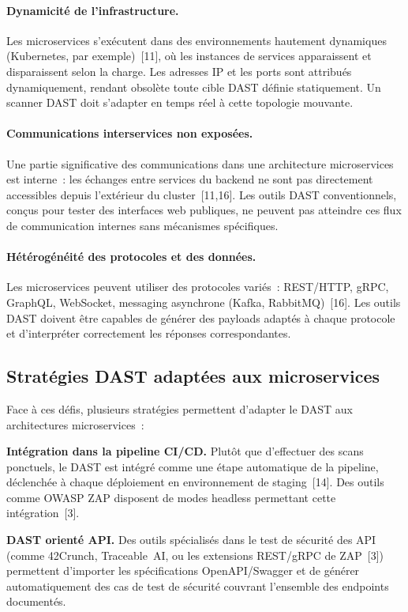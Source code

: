\paragraph{Dynamicité de l'infrastructure.}
Les microservices s'exécutent dans des environnements hautement dynamiques
(Kubernetes, par exemple)~[11], où les instances de services apparaissent et
disparaissent selon la charge. Les adresses IP et les ports sont attribués
dynamiquement, rendant obsolète toute cible DAST définie statiquement. Un
scanner DAST doit s'adapter en temps réel à cette topologie mouvante.

\paragraph{Communications interservices non exposées.}
Une partie significative des communications dans une architecture microservices
est interne~: les échanges entre services du backend ne sont pas directement
accessibles depuis l'extérieur du cluster~[11,16]. Les outils DAST conventionnels,
conçus pour tester des interfaces web publiques, ne peuvent pas atteindre ces
flux de communication internes sans mécanismes spécifiques.

\paragraph{Hétérogénéité des protocoles et des données.}
Les microservices peuvent utiliser des protocoles variés~: REST/HTTP, gRPC,
GraphQL, WebSocket, messaging asynchrone (Kafka, RabbitMQ)~[16]. Les outils DAST
doivent être capables de générer des payloads adaptés à chaque protocole et
d'interpréter correctement les réponses correspondantes.

\subsection{Stratégies DAST adaptées aux microservices}

Face à ces défis, plusieurs stratégies permettent d'adapter le DAST aux
architectures microservices~:

\textbf{Intégration dans la pipeline CI/CD.} Plutôt que d'effectuer des scans
ponctuels, le DAST est intégré comme une étape automatique de la pipeline,
déclenchée à chaque déploiement en environnement de staging~[14]. Des outils
comme OWASP ZAP disposent de modes \og{}headless\fg{} permettant cette
intégration~[3].

\medskip
\textbf{DAST orienté API.} Des outils spécialisés dans le test de sécurité des
API (comme 42Crunch, Traceable~AI, ou les extensions REST/gRPC de ZAP~[3])
permettent d'importer les spécifications OpenAPI/Swagger et de générer
automatiquement des cas de test de sécurité couvrant l'ensemble des endpoints
documentés.

